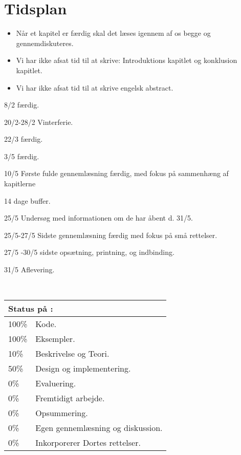 \chapter{Tidsplan}

\begin{itemize}\tightlist
\item Når et kapitel er færdig skal det læses igennem af os begge og gennemdiskuteres.
\item Vi har ikke afsat tid til at skrive: Introduktions kapitlet og konklusion kapitlet.
\item Vi har ikke afsat tid til at skrive engelsk abstract.
\end{itemize}

\begin{list}{}{}
\tightlist 
\item [8/2] \des færdig.
\item [20/2-28/2] Vinterferie.
\item [22/3] \ds færdig.
\item [3/5] \is færdig.
\item [10/5] Første fulde gennemlæsning færdig, med fokus på sammenhæng af kapitlerne
\item [14 dage buffer.]
\item[25/5] Undersøg med informationen om de har åbent d. 31/5.
\item [25/5-27/5] Sidste gennemlæsning færdig med fokus på små rettelser.
\item [27/5 -30/5] sidste opsætning, printning, og indbinding.
\item [31/5] Aflevering. 
\end{list}\
\begin{tabular}{m{0.5cm}m{5cm}}
\hline  
\multicolumn{2}{m{4.5cm}}{\textbf{Status på \des:}} \\
\hline
100\% & Kode.  \\ 
100\% & Eksempler.\\
10\% & Beskrivelse og Teori.\\ %
50\% & Design og  implementering. \\ %
0\% & Evaluering. \\ %
0\% & Fremtidigt arbejde. \\ %
0\% & Opsummering. \\ %
0\% & Egen gennemlæsning og diskussion. \\ %
0\% & Inkorporerer Dortes rettelser. \\ %
\hline
\end{tabular}
